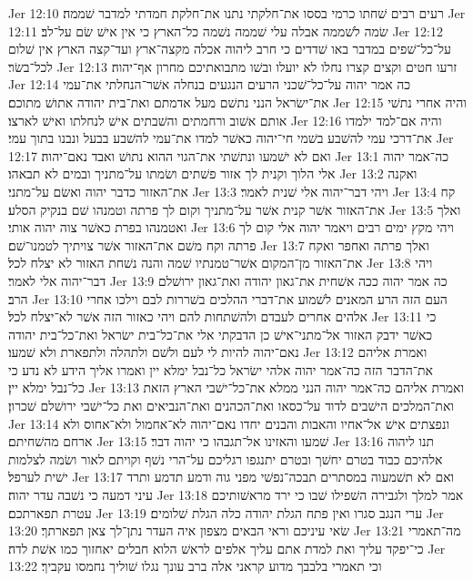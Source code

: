Jer 12:10  רעים רבים שׁחתו כרמי בססו את־חלקתי נתנו את־חלקת חמדתי למדבר שׁממה׃
Jer 12:11  שׂמה לשׁממה אבלה עלי שׁממה נשׁמה כל־הארץ כי אין אישׁ שׂם על־לב׃
Jer 12:12  על־כל־שׁפים במדבר באו שׁדדים כי חרב ליהוה אכלה מקצה־ארץ ועד־קצה הארץ אין שׁלום לכל־בשׂר׃
Jer 12:13  זרעו חטים וקצים קצרו נחלו לא יועלו ובשׁו מתבואתיכם מחרון אף־יהוה׃
Jer 12:14  כה אמר יהוה על־כל־שׁכני הרעים הנגעים בנחלה אשׁר־הנחלתי את־עמי את־ישׂראל הנני נתשׁם מעל אדמתם ואת־בית יהודה אתושׁ מתוכם׃
Jer 12:15  והיה אחרי נתשׁי אותם אשׁוב ורחמתים והשׁבתים אישׁ לנחלתו ואישׁ לארצו׃
Jer 12:16  והיה אם־למד ילמדו את־דרכי עמי להשׁבע בשׁמי חי־יהוה כאשׁר למדו את־עמי להשׁבע בבעל ונבנו בתוך עמי׃
Jer 12:17  ואם לא ישׁמעו ונתשׁתי את־הגוי ההוא נתושׁ ואבד נאם־יהוה׃
Jer 13:1  כה־אמר יהוה אלי הלוך וקנית לך אזור פשׁתים ושׂמתו על־מתניך ובמים לא תבאהו׃
Jer 13:2  ואקנה את־האזור כדבר יהוה ואשׂם על־מתני׃
Jer 13:3  ויהי דבר־יהוה אלי שׁנית לאמר׃
Jer 13:4  קח את־האזור אשׁר קנית אשׁר על־מתניך וקום לך פרתה וטמנהו שׁם בנקיק הסלע׃
Jer 13:5  ואלך ואטמנהו בפרת כאשׁר צוה יהוה אותי׃
Jer 13:6  ויהי מקץ ימים רבים ויאמר יהוה אלי קום לך פרתה וקח משׁם את־האזור אשׁר צויתיך לטמנו־שׁם׃
Jer 13:7  ואלך פרתה ואחפר ואקח את־האזור מן־המקום אשׁר־טמנתיו שׁמה והנה נשׁחת האזור לא יצלח לכל׃
Jer 13:8  ויהי דבר־יהוה אלי לאמר׃
Jer 13:9  כה אמר יהוה ככה אשׁחית את־גאון יהודה ואת־גאון ירושׁלם הרב׃
Jer 13:10  העם הזה הרע המאנים לשׁמוע את־דברי ההלכים בשׁררות לבם וילכו אחרי אלהים אחרים לעבדם ולהשׁתחות להם ויהי כאזור הזה אשׁר לא־יצלח לכל׃
Jer 13:11  כי כאשׁר ידבק האזור אל־מתני־אישׁ כן הדבקתי אלי את־כל־בית ישׂראל ואת־כל־בית יהודה נאם־יהוה להיות לי לעם ולשׁם ולתהלה ולתפארת ולא שׁמעו׃
Jer 13:12  ואמרת אליהם את־הדבר הזה כה־אמר יהוה אלהי ישׂראל כל־נבל ימלא יין ואמרו אליך הידע לא נדע כי כל־נבל ימלא יין׃
Jer 13:13  ואמרת אליהם כה־אמר יהוה הנני ממלא את־כל־ישׁבי הארץ הזאת ואת־המלכים הישׁבים לדוד על־כסאו ואת־הכהנים ואת־הנביאים ואת כל־ישׁבי ירושׁלם שׁכרון׃
Jer 13:14  ונפצתים אישׁ אל־אחיו והאבות והבנים יחדו נאם־יהוה לא־אחמול ולא־אחוס ולא ארחם מהשׁחיתם׃
Jer 13:15  שׁמעו והאזינו אל־תגבהו כי יהוה דבר׃
Jer 13:16  תנו ליהוה אלהיכם כבוד בטרם יחשׁך ובטרם יתנגפו רגליכם על־הרי נשׁף וקויתם לאור ושׂמה לצלמות ישׁית לערפל׃
Jer 13:17  ואם לא תשׁמעוה במסתרים תבכה־נפשׁי מפני גוה ודמע תדמע ותרד עיני דמעה כי נשׁבה עדר יהוה׃
Jer 13:18  אמר למלך ולגבירה השׁפילו שׁבו כי ירד מראשׁותיכם עטרת תפארתכם׃
Jer 13:19  ערי הנגב סגרו ואין פתח הגלת יהודה כלה הגלת שׁלומים׃
Jer 13:20  שׂאי עיניכם וראי הבאים מצפון איה העדר נתן־לך צאן תפארתך׃
Jer 13:21  מה־תאמרי כי־יפקד עליך ואת למדת אתם עליך אלפים לראשׁ הלוא חבלים יאחזוך כמו אשׁת לדה׃
Jer 13:22  וכי תאמרי בלבבך מדוע קראני אלה ברב עונך נגלו שׁוליך נחמסו עקביך׃
